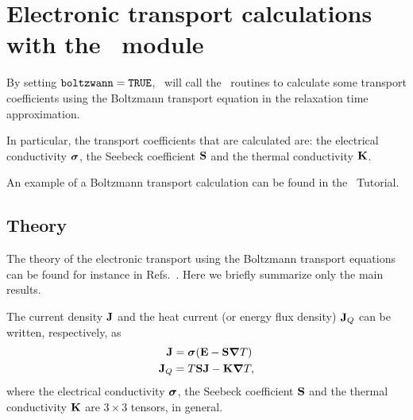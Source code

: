 \chapter{Electronic transport calculations with the \bw\ module}\label{ch:boltzwann}

By setting $\verb#boltzwann#=\verb#TRUE#$, \postw\ will call the \bw\ routines to calculate some transport coefficients using the Boltzmann transport equation in the relaxation time approximation.

In particular, the transport coefficients that are calculated are: the electrical conductivity $\bm{\mathrm{\sigma}}$, the Seebeck coefficient $\bm{\mathrm{S}}$ and the thermal conductivity $\bm{\mathrm{K}}$.

An example of a Boltzmann transport calculation can be found in the \wannier\ Tutorial. 

\section{Theory}
The theory of the electronic transport using the Boltzmann transport equations can be found for instance in Refs.~\cite{Ziman,Grosso,Mahan}. Here we briefly summarize only the main results. 

The current density $\bm{\mathrm{J}}$ and the heat current (or energy flux density) $\bm{\mathrm{J}}_Q$ can be written, respectively, as
\begin{align*}
  \bm{\mathrm{J}}   &= \bm{\mathrm{\sigma}}(\bm{\mathrm{E}} - \bm{\mathrm{S}} \bm{\mathrm{\nabla}} T) \\
  \bm{\mathrm{J}}_Q &= T \bm{\mathrm{S}} \bm{\mathrm{J}} - \bm{\mathrm{K}} \bm{\mathrm{\nabla}} T,
\end{align*}
where the electrical conductivity $\bm{\mathrm{\sigma}}$, the Seebeck coefficient $\bm{\mathrm{S}}$ and the thermal conductivity $\bm{\mathrm{K}}$ are $3\times 3$ tensors, in general.


